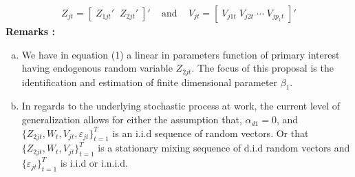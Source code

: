 \documentclass[10pt]{article}
\begin{document}
\begin{align*} 
Z_{jt} = [\; Z_{1jt}' \;\; Z_{2jt}' \;]'  \;\;\; \text{ and } \;\;\; V_{jt} = [ \; V_{j1t} \; V_{j2t} \; \cdots \;V_{jp_1t}\;]'
\end{align*}
%
\noindent \bf Remarks \rm: 
\begin{enumerate}[a.)] 
 \item We have in equation (1) a linear in parameters function of primary interest having endogenous random variable $Z_{2jt}$. The focus of this proposal is the identification and estimation of finite dimensional parameter $\beta_1$. 
 \item In regards to the underlying stochastic process at work, the current level of generalization allows for either the assumption that, $\alpha_{d1} = 0$, and $\{Z_{2jt} , W_{t}, V_{jt}, \varepsilon_{jt} \}_{t=1}^T $ is an i.i.d sequence of random vectors. Or that
$\{Z_{2jt} , W_{t}, V_{jt}\}_{t=1}^T $  is a stationary mixing sequence of d.i.d random vectors and  $\{ \varepsilon_{jt} \}_{t=1}^T$ is i.i.d or i.n.i.d.

\end{enumerate}
\end{document}
